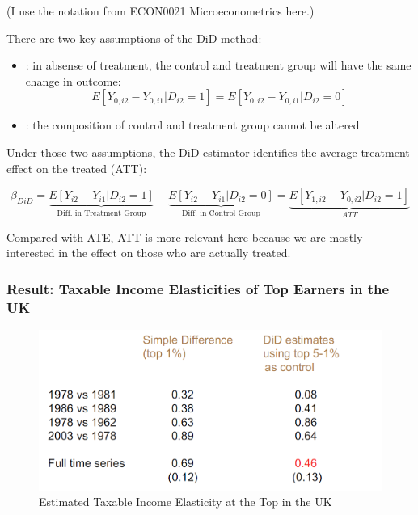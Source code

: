                 (I use the notation from ECON0021 Microeconometrics here.)
                
                There are two key assumptions of the DiD method:
                \begin{itemize}
                    \item {}: in absense of treatment, the control and treatment group will have the same change in outcome:
                    \begin{equation*}
                        E[Y_{0,i2}-Y_{0,i1}|D_{i2}=1]=E[Y_{0,i2}-Y_{0,i1}|D_{i2}=0]
                    \end{equation*}
                    \item {}: the composition of control and treatment group cannot be altered
                \end{itemize}

                Under those two assumptions, the DiD estimator identifies the average treatment effect on the treated (ATT):

                \begin{equation*}
                    \beta_{DiD}=\underbrace{ E[Y_{i2}-Y_{i1}|D_{i2}=1] }_{ \text{Diff. in Treatment Group} }-\underbrace{ E[Y_{i2}-Y_{i1}|D_{i2}=0] }_{ \text{Diff. in Control Group} }=\underbrace{E[Y_{1,i2}-Y_{0,i2}|D_{i2}=1]}_{ATT}
                \end{equation*}
                
                Compared with ATE, ATT is more relevant here because we are mostly interested in the effect on those who are actually treated.


            \subsubsection{Result: Taxable Income Elasticities of Top Earners in the UK}

                \begin{figure}[H]
                    \centering
                    \includegraphics[width=4.5in]{images/ch13/13_DID_3.png}
                    \caption{Estimated Taxable Income Elasticity at the Top in the UK}
                \end{figure}


